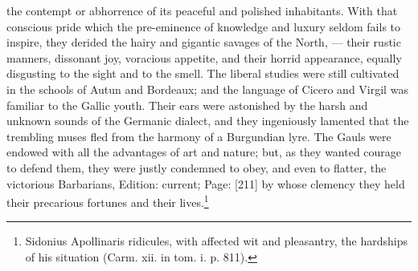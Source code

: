 the contempt or abhorrence of its peaceful and polished inhabitants. With that conscious pride which the pre-eminence of knowledge and luxury seldom fails to inspire, they derided the hairy and gigantic savages of the North, \texthebrew{—} their rustic manners, dissonant joy, voracious appetite, and their horrid appearance, equally disgusting to the sight and to the smell. The liberal studies were still cultivated in the schools of Autun and Bordeaux; and the language of Cicero and Virgil was familiar to the Gallic youth. Their ears were astonished by the harsh and unknown sounds of the Germanic dialect, and they ingeniously lamented that the trembling muses fled from the harmony of a Burgundian lyre. The Gauls were endowed with all the advantages of art and nature; but, as they wanted courage to defend them, they were justly condemned to obey, and even to flatter, the victorious Barbarians, Edition: current; Page: [211] by whose clemency they held their precarious fortunes and their lives.\footnote{Sidonius Apollinaris ridicules, with affected wit and pleasantry, the hardships of his situation (Carm. xii. in tom. i. p. 811).}

